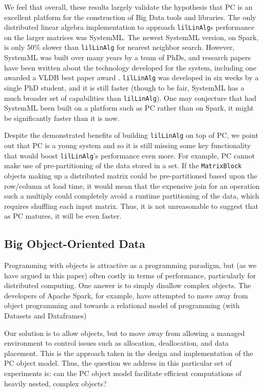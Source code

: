 We feel that overall, these results largely validate the hypothesis that PC is an excellent platform for the 
construction of Big Data tools and libraries.  The only distributed linear algebra implementation
to approach \texttt{lilLinAlg}s performance on the larger matrices
was SystemML.  The newest SystemML version, on Spark, is only 50\% slower than \texttt{lilLinAlg} for nearest neighbor search.
However,
SystemML was built over many years by a team of PhDs, and research papers have been written about the
technology developed for the system, including one awarded a VLDB best paper award \cite{boehm2016systemml}.
\texttt{lilLinAlg} was developed in six weeks by a single PhD student, and it is still
faster (though to be fair, SystemML has a much broader
set of capabilities than \texttt{lilLinAlg}).
One may conjecture that had SystemML been built on a platform such as PC rather than on Spark, it might be significantly
faster than it is now.

Despite the demonstrated benefits of building \texttt{lilLinAlg} on top of PC, we point out that
PC is a young system and so it is still missing some key functionality that would boost
\texttt{lilLinAlg}'s performance even more.  For example, PC cannot make use of pre-partitioning of the data stored in a set. 
If the
\texttt{MatrixBlock} objects making up a distributed
matrix could be pre-partitioned based upon the row/column at load time, it 
would mean that the expensive join for an operation
such a multiply could completely avoid a runtime partitioning of the data, which requires shuffling each input matrix.
Thus, it is not unreasonable to suggest that as PC matures, it will be even faster.

\subsection{Big Object-Oriented Data}

Programming with objects is attractive as a programming paradigm, but (as we have argued in this paper)
often costly in terms of performance, particularly
for distributed computing.  One answer is to simply disallow complex objects.  The 
developers of Apache Spark, for example, have attempted to move away from object programming
and towards a relational model of programming (with Datasets and Dataframes) 

Our solution is to allow objects, but to move away from allowing a managed environment to control 
issues such as allocation, deallocation, and data placement.  This is the approach taken in the design and implementation
of the PC object model.  Thus, the question we address in this particular set of experiments is: can the PC 
object model facilitate efficient computations of heavily nested, complex objects?

